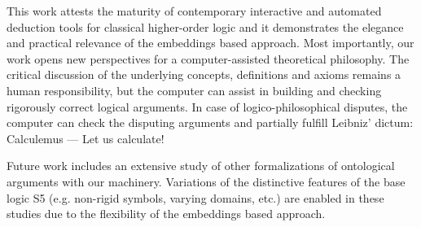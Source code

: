\documentclass{llncs}
\begin{document}
This work attests the maturity of contemporary interactive and
automated deduction tools for classical higher-order logic and it
demonstrates the elegance and practical relevance of the embeddings
based approach.  Most importantly, our work opens new perspectives for
a computer-assisted theoretical philosophy.  The critical discussion
of the underlying concepts, definitions and axioms remains a human
responsibility, but the computer can assist in building and checking
rigorously correct logical arguments. In case of logico-philosophical
disputes, the computer can check the disputing arguments and partially
fulfill Leibniz' dictum: Calculemus --- Let us calculate!

Future work includes an extensive study of other formalizations of
ontological arguments with our machinery. Variations of the
distinctive features of the base logic S5 (e.g. non-rigid symbols, 
varying domains, etc.) are enabled in these studies due
to the flexibility of the embeddings based approach.



\end{document}

